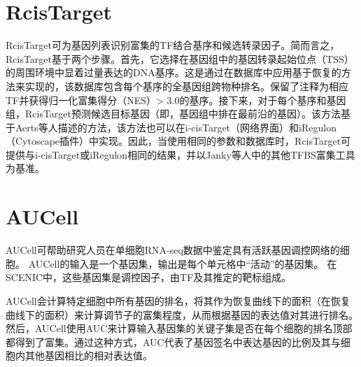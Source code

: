 \section{RcisTarget}
  RcisTarget可为基因列表识别富集的TF结合基序和候选转录因子。简而言之，RcisTarget基于两个步骤。首先，它选择在基因组中的基因转录起始位点（TSS）的周围环境中显着过量表达的DNA基序。这是通过在数据库中应用基于恢复的方法来实现的，该数据库包含每个基序的全基因组跨物种排名。保留了注释为相应TF并获得归一化富集得分（NES）> 3.0的基序。接下来，对于每个基序和基因组，RcisTarget预测候选目标基因（即，基因组中排在最前沿的基因）。该方法基于Aerts等人\cite{aerts2010robust}描述的方法，该方法也可以在i-cisTarget（网络界面）\cite{herrmann2012cistarget}和iRegulon（Cytoscape插件）\cite{verfaillie2014iregulon}中实现。因此，当使用相同的参数和数据库时，RcisTarget可提供与i-cisTarget或iRegulon相同的结果，并以Janky等人\cite{verfaillie2014iregulon}中的其他TFBS富集工具为基准。
\section{AUCell}
  AUCell可帮助研究人员在单细胞RNA-seq数据中鉴定具有活跃基因调控网络的细胞。 AUCell的输入是一个基因集，输出是每个单元格中“活动”的基因集。 在SCENIC中，这些基因集是调控因子，由TF及其推定的靶标组成。

  AUCell会计算特定细胞中所有基因的排名，将其作为恢复曲线下的面积（在恢复曲线下的面积）来计算调节子的富集程度，从而根据基因的表达值对其进行排名。然后，AUCell使用AUC来计算输入基因集的关键子集是否在每个细胞的排名顶部都得到了富集。通过这种方式，AUC代表了基因签名中表达基因的比例及其与细胞内其他基因相比的相对表达值。

